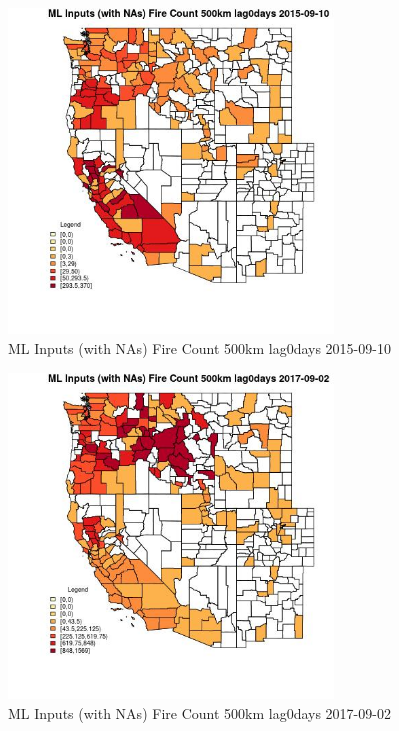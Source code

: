 \begin{figure} 
\centering  
\includegraphics[width=0.77\textwidth]{Code_Outputs/Report_ML_input_PM25_Step4_part_e_de_duplicated_aves_compiled_2019-05-20wNAs_CountyFire_Count_500km_lag0daysMean2015-09-10.jpg} 
\caption{\label{fig:Report_ML_input_PM25_Step4_part_e_de_duplicated_aves_compiled_2019-05-20wNAsCountyFire_Count_500km_lag0daysMean2015-09-10}ML Inputs (with NAs) Fire Count 500km lag0days 2015-09-10} 
\end{figure} 
 

\clearpage 

\begin{figure} 
\centering  
\includegraphics[width=0.77\textwidth]{Code_Outputs/Report_ML_input_PM25_Step4_part_e_de_duplicated_aves_compiled_2019-05-20wNAs_CountyFire_Count_500km_lag0daysMean2017-09-02.jpg} 
\caption{\label{fig:Report_ML_input_PM25_Step4_part_e_de_duplicated_aves_compiled_2019-05-20wNAsCountyFire_Count_500km_lag0daysMean2017-09-02}ML Inputs (with NAs) Fire Count 500km lag0days 2017-09-02} 
\end{figure} 
 

